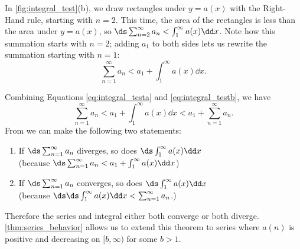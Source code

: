 %
In \autoref{fig:integral_test}(b), we draw rectangles under $y=a(x)$ with the Right-Hand rule, starting with $n=2$. This time, the area of the rectangles is less than the area under $y=a(x)$, so $\ds\sum_{n=2}^\infty a_n < \int_1^\infty a(x)\dd x$. Note how this summation starts with $n=2$; adding $a_1$ to both sides lets us rewrite the summation starting with $n=1$:
\begin{equation}
\sum_{n=1}^\infty a_n < a_1 +\int_1^\infty a(x)\dd x.\label{eq:integral_testb}
\end{equation} 


Combining Equations \eqref{eq:integral_testa} and \eqref{eq:integral_testb}, we have
\begin{equation}
\sum_{n=1}^\infty a_n< a_1 +\int_1^\infty a(x)\dd x < a_1 + \sum_{n=1}^\infty a_n.\label{eq:integral_testc}
\end{equation}
From  we can make the following two statements:
\begin{enumerate}
	\item If $\ds \sum_{n=1}^\infty a_n$ diverges, so does $\ds\int_1^\infty a(x)\dd x$ \\\hfill(because $\ds \sum_{n=1}^\infty a_n < a_1 +\int_1^\infty a(x)\dd x$)
	\item	If $\ds \sum_{n=1}^\infty a_n$ converges, so does $\ds\int_1^\infty a(x)\dd x$ \\\hfill(because $\ds \ds \int_1^\infty a(x)\dd x < \sum_{n=1}^\infty a_n$.)
\end{enumerate}
Therefore the series and integral either both converge or both diverge. \autoref{thm:series_behavior} allows us to extend this theorem to series where $a(n)$ is positive and decreasing on $[b,\infty)$ for some $b>1$.


